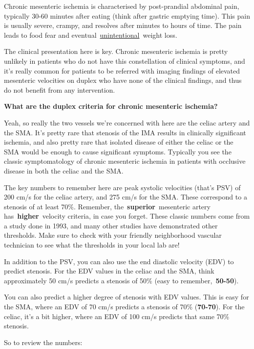 \documentclass[
]{book}
\begin{document}
Chronic mesenteric ischemia is characterised by post-prandial abdominal
pain, typically 30-60 minutes after eating (think after gastric emptying
time). This pain is usually severe, crampy, and resolves after minutes
to hours of time. The pain leads to food fear and
eventual~\underline{unintentional}~weight loss.

The clinical presentation here is key. Chronic mesenteric ischemia is
pretty unlikely in patients who do not have this constellation of
clinical symptoms, and it's really common for patients to be referred
with imaging findings of elevated mesenteric velocities on duplex who
have none of the clinical findings, and thus do not benefit from any
intervention.

\textbf{What are the duplex criteria for chronic mesenteric ischemia?}

Yeah, so really the two vessels we're concerned with here are the celiac
artery and the SMA. It's pretty rare that stenosis of the IMA results in
clinically significant ischemia, and also pretty rare that isolated
disease of either the celiac or the SMA would be enough to cause
significant symptoms. Typically you see the classic symptomatology of
chronic mesenteric ischemia in patients with occlusive disease in both
the celiac and the SMA.

The key numbers to remember here are peak systolic velocities (that's
PSV) of 200 cm/s for the celiac artery, and 275 cm/s for the SMA. These
correspond to a stenosis of at least 70\%. Remember,
the~\textbf{superior}~mesenteric artery has~\textbf{higher}~velocity criteria, in
case you forget. These classic numbers come from a study done in 1993,
and many other studies have demonstrated other thresholds. Make sure to
check with your friendly neighborhood vascular technician to see what
the thresholds in your local lab are!

In addition to the PSV, you can also use the end diastolic velocity
(EDV) to predict stenosis. For the EDV values in the celiac and the SMA,
think approximately 50 cm/s predicts a stenosis of 50\% (easy to
remember,~\textbf{50-50}).

You can also predict a higher degree of stenosis with EDV values. This
is easy for the SMA, where an EDV of 70 cm/s predicts a stenosis of 70\%
(\textbf{70-70}). For the celiac, it's a bit higher, where an EDV of 100 cm/s
predicts that same 70\% stenosis.

So to review the numbers: \citep{monetaDuplexUltrasoundCriteria1991, monetaMesentericDuplexScanning1993, zwolakMesentericCeliacDuplex1998}
\end{document}
